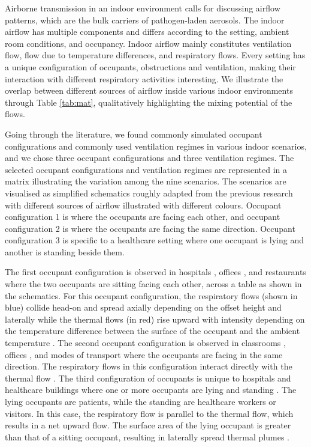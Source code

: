 \documentclass[preprint,12pt]{elsarticle}
\begin{document}
Airborne transmission in an indoor environment calls for discussing airflow patterns, which are the bulk carriers of pathogen-laden aerosols. The indoor airflow has multiple components and differs according to the setting, ambient room conditions, and occupancy. Indoor airflow mainly constitutes ventilation flow, flow due to temperature differences, and respiratory flows. Every setting has a unique configuration of occupants, obstructions and ventilation, making their interaction with different respiratory activities interesting. We illustrate the overlap between different sources of airflow inside various indoor environments through Table \ref{tab:mat}, qualitatively highlighting the mixing potential of the flows.

Going through the literature, we found commonly simulated occupant configurations and commonly used ventilation regimes in various indoor scenarios, and we chose three occupant configurations and three ventilation regimes. The selected occupant configurations and ventilation regimes are represented in a matrix illustrating the variation among the nine scenarios. The scenarios are visualised as simplified schematics roughly adapted from the previous research with different sources of airflow illustrated with different colours. Occupant configuration 1 is where the occupants are facing each other, and occupant configuration 2 is where the occupants are facing the same direction. Occupant configuration 3 is specific to a healthcare setting where one occupant is lying and another is standing beside them.

The first occupant configuration is observed in hospitals \cite{zhou2021experimental}, offices \cite{li2023numerical}, and restaurants \cite{oksanen2022combining} where the two occupants are sitting facing each other, across a table as shown in the schematics. For this occupant configuration, the respiratory flows (shown in blue) collide head-on and spread axially depending on the offset height and laterally \cite{giri2022colliding, singhal2022virus} while the thermal flows (in red) rise upward with intensity depending on the temperature difference between the surface of the occupant and the ambient temperature \cite{zhang2019distribution}. The second occupant configuration is observed in classrooms \cite{qin2023transmission}, offices \cite{he2011cfd}, and modes of transport \cite{yan2021transmission,ho2021modeling} where the occupants are facing in the same direction. The respiratory flows in this configuration interact directly with the thermal flow \cite{ou2022insufficient}. The third configuration of occupants is unique to hospitals and healthcare buildings where one or more occupants are lying and standing \cite{villafruela2019assessment, lu2020reducing}. The lying occupants are patients, while the standing are healthcare workers or visitors. In this case, the respiratory flow is parallel to the thermal flow, which results in a net upward flow. The surface area of the lying occupant is greater than that of a sitting occupant, resulting in laterally spread thermal plumes \cite{feng2020influence}.
\end{document}

